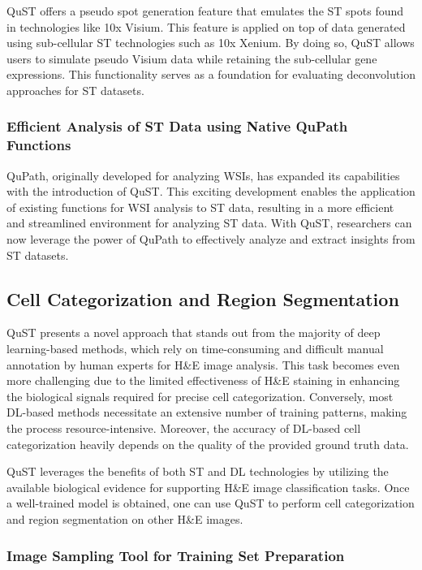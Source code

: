 \documentclass{article}
\begin{document}
QuST offers a pseudo spot generation feature that emulates the ST spots found in technologies like 10x Visium. This feature is applied on top of data generated using sub-cellular ST technologies such as 10x Xenium. By doing so, QuST allows users to simulate pseudo Visium data while retaining the sub-cellular gene expressions. This functionality serves as a foundation for evaluating deconvolution approaches for ST datasets.

\subsubsection{Efficient Analysis of ST Data using Native QuPath Functions}
\label{sec:qupathscfunc}

QuPath, originally developed for analyzing WSIs, has expanded its capabilities with the introduction of QuST. This exciting development enables the application of existing functions for WSI analysis to ST data, resulting in a more efficient and streamlined environment for analyzing ST data. With QuST, researchers can now leverage the power of QuPath to effectively analyze and extract insights from ST datasets.

\subsection{Cell Categorization and Region Segmentation}
\label{sec:dldia}

QuST presents a novel approach that stands out from the majority of deep learning-based methods, which rely on time-consuming and difficult manual annotation by human experts for H\&E image analysis. This task becomes even more challenging due to the limited effectiveness of H\&E staining in enhancing the biological signals required for precise cell categorization. Conversely, most DL-based methods necessitate an extensive number of training patterns, making the process resource-intensive. Moreover, the accuracy of DL-based cell categorization heavily depends on the quality of the provided ground truth data.

QuST leverages the benefits of both ST and DL technologies by utilizing the available biological evidence for supporting H\&E image classification tasks. Once a well-trained model is obtained, one can use QuST to perform cell categorization and region segmentation on other H\&E images.

\subsubsection{Image Sampling Tool for Training Set Preparation}
\label{sec:image_sampling}
\end{document}
